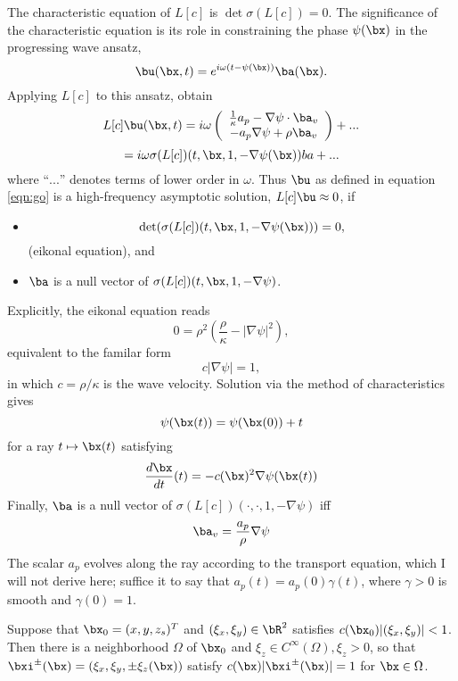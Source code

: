 The characteristic equation of $L[c]$ is $\det \sigma(L[c]) = 0$. The significance of the characteristic equation is its role in constraining the phase $\psi(\bx)$ in the progressing wave ansatz,
\begin{equation}
  \label{eqn:go}
  \bu(\bx,t) = e^{i\omega (t-\psi(\bx))} \ba (\bx).
\end{equation}
Applying $L[c]$ to this ansatz, obtain
\[
  L[c]\bu(\bx,t)=i \omega
  \left(
    \begin{array}{c}
      \frac{1}{\kappa}a_p -  \nabla \psi \cdot \ba_v \\
      -a_p \nabla \psi + \rho \ba_v
    \end{array}
  \right) + ...
\]
\[
  = i \omega \sigma(L[c])(t,\bx,1,- \nabla \psi(\bx))ba + ...
\]
where ``$...$'' denotes terms of lower order in $\omega$. Thus $\bu$ as defined in equation \ref{eqn:go} is a high-frequency asymptotic solution, $L[c]\bu \approx 0$, if
\begin{itemize}
\item
  \begin{equation}
    \label{eqn:eik}
    \det(\sigma(L[c])(t,\bx,1,-\nabla \psi(\bx))) = 0,
  \end{equation}
  (eikonal equation), and
\item
  $\ba$ is a null vector of $\sigma(L[c])(t,\bx,1,-\nabla \psi)$.
\end{itemize}
Explicitly, the eikonal equation reads
\[
  0 = \rho^2\left(\frac{\rho}{\kappa}-|\nabla \psi|^2\right),
\]
equivalent to the familar form
\begin{equation}
  \label{eqn:usualeik}
  c|\nabla \psi| = 1,
\end{equation}
in which $c = \rho/\kappa$ is the wave velocity. Solution via the method of characteristics gives
\[
  \psi(\bx(t)) = \psi(\bx(0)) + t
\]
for a ray $t \mapsto \bx(t)$ satisfying
\[
  \frac{d\bx}{dt}(t) = -c(\bx)^2\nabla \psi(\bx(t))
\]
Finally, $\ba$ is a null vector of $\sigma(L[c])(\cdot,\cdot,1,-\nabla \psi)$ iff
\begin{equation}
  \label{eqn:godton}
  \ba_v = \frac{a_p}{\rho}\nabla \psi
\end{equation}
The scalar $a_p$ evolves along the ray according to the transport equation, which I will not derive here; suffice it to say that $a_p(t) = a_p(0) \gamma(t)$, where $\gamma > 0$ is smooth and $\gamma(0)=1$.

Suppose that $\bx_0 = (x,y,z_s)^T$ and $(\xi_x,\xi_y) \in \bR^2$ satisfies $c(\bx_0)|(\xi_x,\xi_y)|<1$. Then there is a neighborhood $\Omega$ of $\bx_0$ and $\xi_z \in C^{\infty}(\Omega), \xi_z>0$, so that $\bxi^{\pm}(\bx)=(\xi_x,\xi_y,\pm \xi_z(\bx))$ satisfy $c(\bx)|\bxi^{\pm}(\bx)|=1$ for $\bx \in \Omega$.

